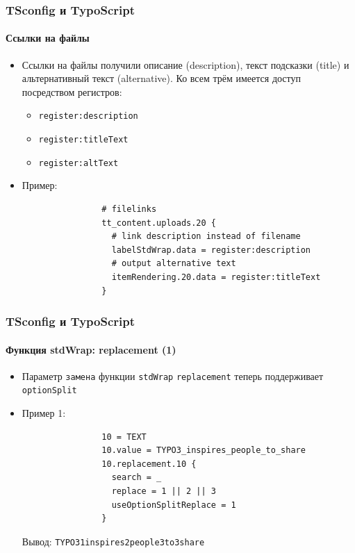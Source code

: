 \begin{frame}[fragile]
	\frametitle{TSconfig и TypoScript}
	\framesubtitle{Ссылки на файлы}

	\begin{itemize}
		\item Ссылки на файлы получили описание (description), текст подсказки (title) и альтернативный текст (alternative).
			Ко всем трём имеется доступ посредством регистров:

			\begin{itemize}
				\item \texttt{register:description}
				\item \texttt{register:titleText}
				\item \texttt{register:altText}
			\end{itemize}

		\item Пример:

			\begin{lstlisting}
				# filelinks
				tt_content.uploads.20 {
				  # link description instead of filename
				  labelStdWrap.data = register:description
				  # output alternative text
				  itemRendering.20.data = register:titleText
				}
			\end{lstlisting}

	\end{itemize}

\end{frame}


\begin{frame}[fragile]
	\frametitle{TSconfig и TypoScript}
	\framesubtitle{Функция stdWrap: replacement (1)}

	\begin{itemize}
		\item Параметр \texttt{замена} функции \texttt{stdWrap} \texttt{replacement}\newline
			теперь поддерживает \texttt{optionSplit}

		\item Пример 1:

			\begin{lstlisting}
				10 = TEXT
				10.value = TYPO3_inspires_people_to_share
				10.replacement.10 {
				  search = _
				  replace = 1 || 2 || 3
				  useOptionSplitReplace = 1
				}
			\end{lstlisting}

			Вывод:\newline
				\texttt{TYPO31inspires2people3to3share}

	\end{itemize}

\end{frame}

